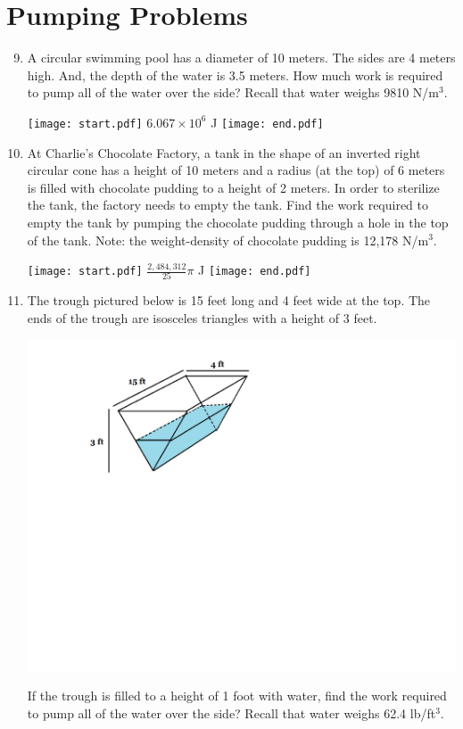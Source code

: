 \documentclass[12pt]{article}
\begin{document}
\section*{Pumping Problems}

\begin{enumerate}
\setcounter{enumi}{8}

\item A circular swimming pool has a diameter of 10 meters.  The sides are 4 meters high.  And, the depth of the water is 3.5 meters.  How much work is required to pump all of the water over the side?  Recall that water weighs 9810 N/m$^3$.

\texttt{[image: start.pdf]}
{{$6.067 \times 10^6$ J}}
\texttt{[image: end.pdf]}


\item At Charlie's Chocolate Factory, a tank in the shape of an inverted right circular cone has a height of 10 meters and a radius (at the top) of 6 meters is filled with chocolate pudding to a height of 2 meters.  In order to sterilize the tank, the factory needs to empty the tank.  Find the work required to empty the tank by pumping the chocolate pudding through a hole in the top of the tank. Note: the weight-density of chocolate pudding is 12,178 N/m$^3$.

\texttt{[image: start.pdf]}
{{$\frac{2,484,312}{25}\pi$ J}}
\texttt{[image: end.pdf]}


\item The trough pictured below is 15 feet long and 4 feet wide at the top.  The ends of the trough are isosceles triangles with a height of 3 feet.  
\begin{center}
\includegraphics[scale=0.6]{trough.pdf}
\end{center}
If the trough is filled to a height of 1 foot with water, find the work required to pump all of the water over the side?  Recall that water weighs 62.4 lb/ft$^3$.


\end{enumerate}
\end{document}
